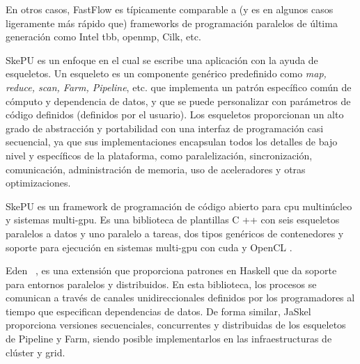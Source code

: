 En otros casos, FastFlow es típicamente comparable a (y es en algunos casos ligeramente más rápido que) frameworks de programación paralelos de última generación como Intel \acrshort{tbb}, \acrshort{openmp}, Cilk, etc.

SkePU \cite{Ernstsson2018} es un enfoque en el cual se escribe una aplicación con la ayuda de esqueletos. Un esqueleto es un componente genérico predefinido como \emph{map, reduce, scan, Farm, Pipeline}, etc. que implementa un patrón específico común de cómputo y dependencia de datos, y que se puede personalizar con parámetros de código definidos (definidos por el usuario). Los esqueletos proporcionan un alto grado de abstracción y portabilidad con una interfaz de programación casi secuencial, ya que sus implementaciones encapsulan todos los detalles de bajo nivel y específicos de la plataforma, como paralelización, sincronización, comunicación, administración de memoria, uso de aceleradores y otras optimizaciones.

SkePU es un framework de programación de código abierto para \acrshort{cpu} multinúcleo y sistemas multi-\acrshort{gpu}. Es una biblioteca de plantillas C ++ con seis esqueletos paralelos a datos y uno paralelo a tareas, dos tipos genéricos de contenedores y soporte para ejecución en sistemas multi-\acrshort{gpu} con \acrshort{cuda} \cite{luebke2008cuda} y OpenCL \cite{stone2010opencl}.

Eden ~\cite{Loogen:2005}, es una extensión que proporciona patrones en Haskell que da soporte para entornos paralelos y distribuidos. En esta biblioteca, los procesos se comunican a través de canales unidireccionales definidos por los programadores al tiempo que especifican dependencias de datos. De forma similar, JaSkel ~\cite {Ferreira:2006} proporciona versiones secuenciales, concurrentes y distribuidas de los esqueletos de Pipeline y Farm, siendo posible implementarlos en las infraestructuras de clúster y grid.

